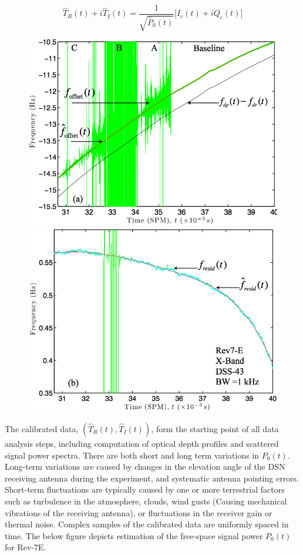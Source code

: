 \documentclass{article}
\theoremstyle{mystyle}
\begin{document}
\begin{equation}
\hat{T}_{R}(t) + i\hat{T}_{I}(t) = \frac{1}{\sqrt{\hat{P}_{0}(t)}}\big[I_{c}(t) + iQ_{c}(t)\big]
\end{equation}

\begin{figure}[htbp]
  \centering
{\includegraphics[scale=0.3]{USER_8}}
  \hfill
  {\includegraphics[scale=0.3]{USER_8a}}
  \hfill
\end{figure}

\noindent The calibrated data, $(\hat{T}_{R}(t),\hat{T}_{I}(t))$, form the starting point of all data analysis steps, including computation of optical depth profiles and scattered signal power spectra. There are both short and long term variations in $P_{0}(t)$. Long-term variations are caused by changes in the elevation angle of the DSN receiving antenna during the experiment, and systematic antenna pointing errors. Short-term fluctuations are typically caused by one or more terrestrial factors such as turbulence in the atmosphere, clouds, wind gusts (Causing mechanical vibrations of the receiving antenna), or fluctuations in the receiver gain or thermal noise. Complex samples of the calibrated data are uniformly spaced in time. The below figure depicts estimation of the free-space signal power $P_0(t)$ for Rev-7E.
\end{document}
